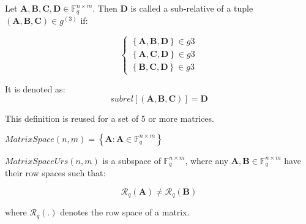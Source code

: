 %
\begin{defn}
 Let $\boldsymbol{A},\boldsymbol{B},\boldsymbol{C},\boldsymbol{D}\in\ensuremath{\mathbb{F}}_{q}^{n\times m}$.
Then $\boldsymbol{D}$ is called a sub-relative of a tuple $\left(\boldsymbol{A},\boldsymbol{B},\boldsymbol{C}\right)\in g^{\left(3\right)}$
if:

\[
\left\{ \begin{array}{c}
\left\{ \boldsymbol{A},\boldsymbol{B},\boldsymbol{D}\right\} \in g3\\
\left\{ \boldsymbol{A},\boldsymbol{C},\boldsymbol{D}\right\} \in g3\\
\left\{ \boldsymbol{B},\boldsymbol{C},\boldsymbol{D}\right\} \in g3
\end{array}\right.
\]

It is denoted as: 
\[
subrel\left[\left(\boldsymbol{A},\boldsymbol{B},\boldsymbol{C}\right)\right]=\boldsymbol{D}
\]

This definition is reused for a set of 5 or more matrices.
\end{defn}
%
\begin{defn}[MatrixSpace]
 $MatrixSpace(n,m)=\left\{ \boldsymbol{A}:\boldsymbol{A}\in\ensuremath{\mathbb{F}}_{q}^{n\times m}\right\} $
\end{defn}
%
\begin{defn}
 $MatrixSpaceUrs(n,m)$ is a subspace of $\ensuremath{\mathbb{F}}_{q}^{n\times m}$,
where any $\boldsymbol{A},\boldsymbol{B}\in\ensuremath{\mathbb{F}}_{q}^{n\times m}$
have their row spaces such that:

\[
\mathcal{R}_{q}\left(\boldsymbol{A}\right)\neq\mathcal{R}_{q}\left(\boldsymbol{B}\right)
\]

where $\mathcal{R}_{q}\left(.\right)$ denotes the row space of a
matrix.
\end{defn}

